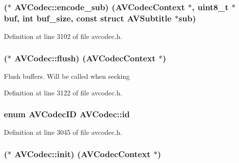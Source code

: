 \subsubsection[{\texorpdfstring{encode\+\_\+sub}{encode_sub}}]{($\ast$ A\+V\+Codec\+::encode\+\_\+sub) ({\bf A\+V\+Codec\+Context} $\ast$, {\bf uint8\+\_\+t} $\ast${\bf buf}, {\bf int} buf\+\_\+size, {\bf const} struct {\bf A\+V\+Subtitle} $\ast$sub)}\hypertarget{struct_a_v_codec_a5d108464b7461d2e4f1e27ad685c8c2b}{}\label{struct_a_v_codec_a5d108464b7461d2e4f1e27ad685c8c2b}


Definition at line 3102 of file avcodec.\+h.

\subsubsection[{\texorpdfstring{flush}{flush}}]{($\ast$ A\+V\+Codec\+::flush) ({\bf A\+V\+Codec\+Context} $\ast$)}\hypertarget{struct_a_v_codec_a70d96d86e4c055f218d5164f94685647}{}\label{struct_a_v_codec_a70d96d86e4c055f218d5164f94685647}
Flush buffers. Will be called when seeking 

Definition at line 3122 of file avcodec.\+h.

\subsubsection[{\texorpdfstring{id}{id}}]{\setlength{\rightskip}{0pt plus 5cm}enum {\bf A\+V\+Codec\+ID} A\+V\+Codec\+::id}\hypertarget{struct_a_v_codec_a01a53d07936f4c7ee280444793b6967b}{}\label{struct_a_v_codec_a01a53d07936f4c7ee280444793b6967b}


Definition at line 3045 of file avcodec.\+h.

\subsubsection[{\texorpdfstring{init}{init}}]{($\ast$ A\+V\+Codec\+::init) ({\bf A\+V\+Codec\+Context} $\ast$)}\hypertarget{struct_a_v_codec_a76f222be1221210dadda60e4fce08e80}{}\label{struct_a_v_codec_a76f222be1221210dadda60e4fce08e80}


